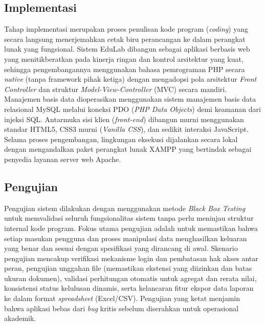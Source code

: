 \documentclass[12pt,a4paper,twoside]{report}
\begin{document}
\subsection{Implementasi}
Tahap implementasi merupakan proses penulisan kode program (\textit{coding}) yang secara langsung menerjemahkan cetak biru perancangan ke dalam perangkat lunak yang fungsional. Sistem EduLab dibangun sebagai aplikasi berbasis web yang menitikberatkan pada kinerja ringan dan kontrol arsitektur yang kuat, sehingga pengembangannya menggunakan bahasa pemrograman PHP secara \textit{native} (tanpa framework pihak ketiga) dengan mengadopsi pola arsitektur \textit{Front Controller} dan struktur \textit{Model-View-Controller} (MVC) secara mandiri. Manajemen basis data dioperasikan menggunakan sistem manajemen basis data relasional MySQL melalui koneksi PDO (\textit{PHP Data Objects}) demi keamanan dari injeksi SQL. Antarmuka sisi klien (\textit{front-end}) dibangun murni menggunakan standar HTML5, CSS3 murni (\textit{Vanilla CSS}), dan sedikit interaksi JavaScript. Selama proses pengembangan, lingkungan eksekusi dijalankan secara lokal dengan mengandalkan paket perangkat lunak XAMPP yang bertindak sebagai penyedia layanan server web Apache.

\subsection{Pengujian}
Pengujian sistem dilakukan dengan menggunakan metode \textit{Black Box Testing} untuk memvalidasi seluruh fungsionalitas sistem tanpa perlu meninjau struktur internal kode program. Fokus utama pengujian adalah untuk memastikan bahwa setiap masukan pengguna dan proses manipulasi data menghasilkan keluaran yang benar dan sesuai dengan spesifikasi yang dirancang di awal. Skenario pengujian mencakup verifikasi mekanisme login dan pembatasan hak akses antar peran, pengujian unggahan file (memastikan ekstensi yang diizinkan dan batas ukuran dokumen), validasi perhitungan otomatis untuk agregat dan rerata nilai, konsistensi status kelulusan dinamis, serta kelancaran fitur ekspor data laporan ke dalam format \textit{spreadsheet} (Excel/CSV). Pengujian yang ketat menjamin bahwa aplikasi bebas dari \textit{bug} kritis sebelum diserahkan untuk operasional akademik.
\end{document}
